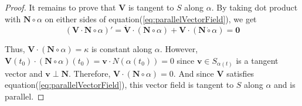 \begin{proof}
	It remains to prove that $\mathbf{V}$ is tangent to $S$ along $\alpha$. By taking dot product with $\mathbf{N} \circ \alpha$ on either sides of equation(\ref{eq:parallelVectorField}), we get
\begin{equation}
	(\mathbf{V} \cdot \mathbf{N} \circ \alpha)'= \dot{\mathbf{V}} \cdot (\mathbf{N} \circ \alpha) + \mathbf{V} \cdot (\mathbf{N} \dot{\circ} \alpha) = \mathbf{0}
\end{equation}

	Thus, $\mathbf{V} \cdot (\mathbf{N} \circ \alpha) = \kappa$ is constant along $\alpha$. However, $\mathbf{V}(t_0) \cdot (\mathbf{N} \circ \alpha)(t_0) = \mathbf{v} \cdot N(\alpha(t_0)) = 0$ since $\mathbf{v} \in S_{\alpha(t)}$ is a tangent vector and $\mathbf{v} \perp \mathbf{N}$. Therefore, $\mathbf{V} \cdot (\mathbf{N} \circ \alpha) = 0$. And since $\mathbf{V}$ satisfies equation(\ref{eq:parallelVectorField}), this vector field is tangent to $S$ along $\alpha$ and is parallel.
\end{proof}


